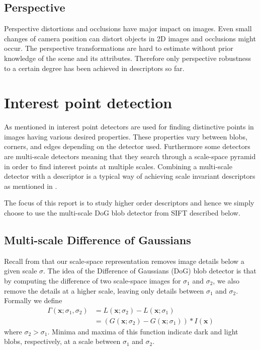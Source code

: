 \documentclass[thesis.tex]{subfiles}
\def\x{\mathbf{x}}
\begin{document}
\subsection{Perspective}
Perspective distortions and occlusions have major impact on images. Even small changes of camera position can distort objects in 2D images and occlusions might occur. The perspective transformations are hard to estimate without prior knowledge of the scene and its attributes. Therefore only perspective robustness to a certain degree has been achieved in descriptors so far.

\section{Interest point detection}
\label{sec:interestPointDetectors}
As mentioned in  interest point detectors are used for finding distinctive points in images having various desired properties. These properties vary between blobs, corners, and edges depending on the detector used. Furthermore some detectors are multi-scale detectors meaning that they search through a scale-space pyramid in order to find interest points at multiple scales. Combining a multi-scale detector with a descriptor is a typical way of achieving scale invariant descriptors as mentioned in .

The focus of this report is to study higher order descriptors and hence we simply choose to use the multi-scale DoG blob detector from SIFT \cite{lowe2004distinctive} described below.

\subsection{Multi-scale Difference of Gaussians}
\label{sec:multiscaleDoG}

Recall from  that our scale-space representation removes image details below a given scale $\sigma$. The idea of the Difference of Gaussians (DoG) blob detector is that by computing the difference of two scale-space images for $\sigma_1$ and $\sigma_2$, we also remove the details at a higher scale, leaving only details between $\sigma_1$ and $\sigma_2$. Formally we define
%
\begin{align*}
\Gamma(\x;\sigma_1,\sigma_2) &= L(\x;\sigma_2) - L(\x;\sigma_1) \\
&= \left( G(\x;\sigma_2) - G(\x;\sigma_1) \right) \ast I(\x)
\end{align*}
%
where $\sigma_2 > \sigma_1$. Minima and maxima of this function indicate dark and light blobs, respectively, at a scale between $\sigma_1$ and $\sigma_2$.
\end{document}

